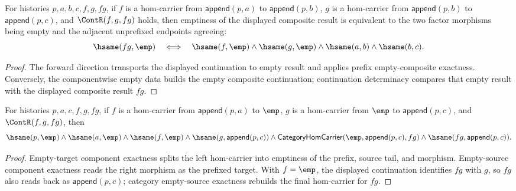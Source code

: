 \begin{theorem}
\label{thm:functor-prefix-hom-carrier-comp-result-empty}
For histories $p,a,b,c,f,g,fg$, if $f$ is a hom-carrier from
$\mathsf{append}(p,a)$ to $\mathsf{append}(p,b)$, $g$ is a hom-carrier from
$\mathsf{append}(p,b)$ to $\mathsf{append}(p,c)$, and $\ContR(f,g,fg)$ holds,
then emptiness of the displayed composite result is equivalent to the two
factor morphisms being empty and the adjacent unprefixed endpoints agreeing:
$$
\hsame(fg,\emp)
\quad\Longleftrightarrow\quad
\hsame(f,\emp)\wedge\hsame(g,\emp)\wedge\hsame(a,b)\wedge\hsame(b,c).
$$
\end{theorem}
\begin{proof}
The forward direction transports the displayed continuation to empty result
and applies prefix empty-composite exactness. Conversely, the componentwise
empty data builds the empty composite continuation; continuation determinacy
compares that empty result with the displayed composite result $fg$.
\end{proof}

\begin{theorem}
\label{thm:functor-prefix-hom-comp-empty-middle-inversion}
For histories $p,a,c,f,g,fg$, if $f$ is a hom-carrier from
$\mathsf{append}(p,a)$ to $\emp$, $g$ is a hom-carrier from $\emp$
to $\mathsf{append}(p,c)$, and $\ContR(f,g,fg)$, then
$$
\hsame(p,\emp)\wedge\hsame(a,\emp)\wedge\hsame(f,\emp)\wedge
\hsame(g,\mathsf{append}(p,c))\wedge
\mathsf{CategoryHomCarrier}(\emp,\mathsf{append}(p,c),fg)\wedge
\hsame(fg,\mathsf{append}(p,c)).
$$
\end{theorem}
\begin{proof}
Empty-target component exactness splits the left hom-carrier into emptiness of
the prefix, source tail, and morphism. Empty-source component exactness reads
the right morphism as the prefixed target. With $f=\emp$, the displayed
continuation identifies $fg$ with $g$, so $fg$ also reads back as
$\mathsf{append}(p,c)$; category empty-source exactness rebuilds the final
hom-carrier for $fg$.
\end{proof}


